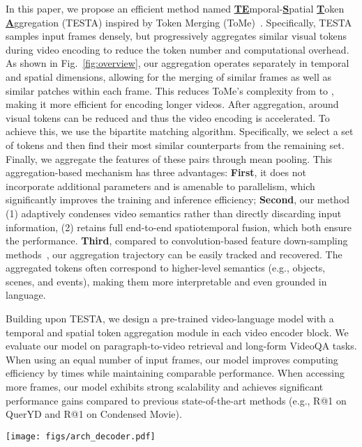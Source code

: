 \documentclass[11pt]{article}
\newcommand{\modelname}{TESTA\xspace}
\newcommand{\acronym}[1]{\underline{\textbf{#1}}}
\begin{document}
In this paper, we propose an efficient method named \acronym{TE}mporal-\acronym{S}patial \acronym{T}oken \acronym{A}ggregation (\modelname) inspired by Token Merging (ToMe)~\citep{Bolya2022TokenMY}. 
Specifically, \modelname samples input frames densely, but progressively aggregates similar visual tokens during video encoding to reduce the token number and computational overhead. 
As shown in Fig.~\ref{fig:overview}, our aggregation operates separately in temporal and spatial dimensions, allowing for the merging of similar frames as well as similar patches within each frame. This reduces ToMe's complexity from  to , making it more efficient for encoding longer videos. 
After aggregation, around  visual tokens can be reduced and thus the video encoding is accelerated. 
To achieve this, we use the bipartite matching algorithm. 
Specifically, we select a set of tokens and then find their most similar counterparts from the remaining set. 
Finally, we aggregate the features of these pairs through mean pooling. 
This aggregation-based mechanism has three advantages: 
\textbf{First}, it does not incorporate additional parameters and is amenable to parallelism, which significantly improves the training and inference efficiency; 
\textbf{Second}, our method (1) adaptively condenses video semantics rather than directly discarding input information, (2) retains full end-to-end spatiotemporal fusion, which both ensure the performance. 
\textbf{Third}, compared to convolution-based feature down-sampling methods~\citep{Liu2021VideoST, Li2021MViTv2IM}, our aggregation trajectory can be easily tracked and recovered. The aggregated tokens often correspond to higher-level semantics (e.g., objects, scenes, and events), making them more interpretable and even grounded in language. 



Building upon \modelname, we design a pre-trained video-language model with a temporal and spatial token aggregation module in each video encoder block. We evaluate our model on paragraph-to-video retrieval and long-form VideoQA tasks. 
When using an equal number of input frames, our model improves computing efficiency by  times while maintaining comparable performance. 
When accessing more frames, our model exhibits strong scalability and achieves significant performance gains compared to previous state-of-the-art methods (e.g.,  R@1 on QuerYD and  R@1 on Condensed Movie).  


\begin{figure*}[t]
\centering
\texttt{[image: figs/arch\_decoder.pdf]}
\caption{Architecture of our pre-trained model and token aggregation algorithm of \modelname. We record the size of the input and output features in red. The circles in the left panel denote either patch tokens or frame tokens.}
\label{fig:arch}
\end{figure*}
\end{document}
